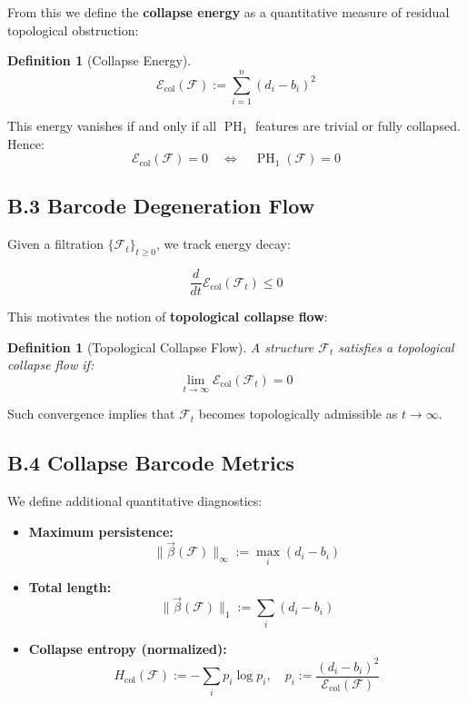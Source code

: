 \documentclass[11pt]{article}
\newtheorem{definition}[theorem]{Definition}
\DeclareMathOperator{\PH}{PH}
\begin{document}
From this we define the \textbf{collapse energy} as a quantitative measure of residual topological obstruction:

\begin{definition}[Collapse Energy]
\[
\mathcal{E}_{\mathrm{col}}(\mathcal{F}) := \sum_{i=1}^{n} (d_i - b_i)^2
\]
\end{definition}

This energy vanishes if and only if all $\PH_1$ features are trivial or fully collapsed. Hence:
\[
\mathcal{E}_{\mathrm{col}}(\mathcal{F}) = 0 \quad \Longleftrightarrow \quad \PH_1(\mathcal{F}) = 0
\]

\subsection*{B.3 Barcode Degeneration Flow}

Given a filtration $\{ \mathcal{F}_t \}_{t \geq 0}$, we track energy decay:

\[
\frac{d}{dt} \mathcal{E}_{\mathrm{col}}(\mathcal{F}_t) \leq 0
\]

This motivates the notion of \textbf{topological collapse flow}:

\begin{definition}[Topological Collapse Flow]
A structure $\mathcal{F}_t$ satisfies a topological collapse flow if:
\[
\lim_{t \to \infty} \mathcal{E}_{\mathrm{col}}(\mathcal{F}_t) = 0
\]
\end{definition}

Such convergence implies that $\mathcal{F}_t$ becomes topologically admissible as $t \to \infty$.

\subsection*{B.4 Collapse Barcode Metrics}

We define additional quantitative diagnostics:

\begin{itemize}
    \item \textbf{Maximum persistence:}
    \[
    \|\vec{\beta}(\mathcal{F})\|_{\infty} := \max_i (d_i - b_i)
    \]
    \item \textbf{Total length:}
    \[
    \|\vec{\beta}(\mathcal{F})\|_{1} := \sum_i (d_i - b_i)
    \]
    \item \textbf{Collapse entropy (normalized):}
    \[
    H_{\mathrm{col}}(\mathcal{F}) := - \sum_i p_i \log p_i, \quad p_i := \frac{(d_i - b_i)^2}{\mathcal{E}_{\mathrm{col}}(\mathcal{F})}
    \]
\end{itemize}
\end{document}
